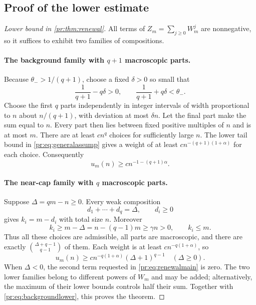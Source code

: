 \documentclass[11pt,a4paper]{article}
\theoremstyle{definition}\newaliascnt{definition}{theorem}
\theoremstyle{remark}\newaliascnt{remark}{theorem}
\begin{document}
\subsection{Proof of the lower estimate}
\begin{proof}[Lower bound in \cref{pr:thm:renewal}]
All terms of $Z_m=\sum_{j\ge0}W_m^j$ are nonnegative, so it suffices to
exhibit two families of compositions.

\paragraph{The background family with $q+1$ macroscopic parts.}
Because $\theta_->1/(q+1)$, choose a fixed $\delta>0$ so small that
\[
 \frac1{q+1}-q\delta>0,
 \qquad \frac1{q+1}+q\delta<\theta_-.
\]
Choose the first $q$ parts independently in integer intervals of width
proportional to $n$ about $n/(q+1)$, with deviation at most $\delta n$. Let
the final part make the sum equal to $n$. Every part then lies between fixed
positive multiples of $n$ and is at most $m$. There are at least $c n^q$
choices for sufficiently large $n$. The lower tail bound in
\eqref{pr:eq:generalassump} gives a weight of at least
$c n^{-(q+1)(1+\alpha)}$ for each choice. Consequently
\begin{equation}
 u_m(n)\ge c n^{-1-(q+1)\alpha}.
 \label{pr:eq:backgroundlower}
\end{equation}

\paragraph{The near-cap family with $q$ macroscopic parts.}
Suppose $\Delta=qm-n\ge0$. Every weak composition
\[
 d_1+\cdots+d_q=\Delta,\qquad d_i\ge0
\]
gives $k_i=m-d_i$ with total size $n$. Moreover
\[
 k_i\ge m-\Delta=n-(q-1)m\ge\gamma n>0,
 \qquad k_i\le m.
\]
Thus all these choices are admissible, all parts are macroscopic, and there
are exactly $\binom{\Delta+q-1}{q-1}$ of them. Each weight is at least
$c n^{-q(1+\alpha)}$, so
\begin{equation}
 u_m(n)\ge c n^{-q(1+\alpha)}(\Delta+1)^{q-1}
 \quad(\Delta\ge0).
 \label{pr:eq:caplower}
\end{equation}
When $\Delta<0$, the second term requested in \eqref{pr:eq:renewalmain} is
zero. The two lower families belong to different powers of $W_m$ and may be
added; alternatively, the maximum of their lower bounds controls half their
sum. Together with \eqref{pr:eq:backgroundlower}, this proves the theorem.
\end{proof}
\end{document}
